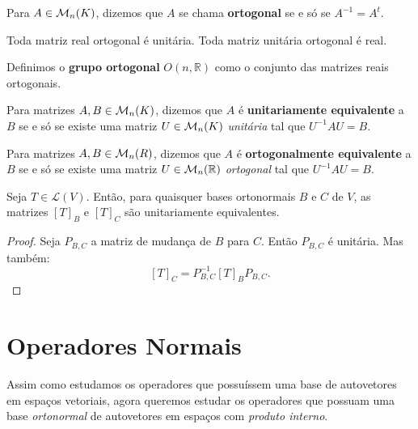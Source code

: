 \documentclass[11pt,twoside,a4paper]{book}
\begin{document}
\begin{definicao}
Para $A\in\mathcal{M}_{n}(K)$, dizemos que $A$ se chama \textbf{ortogonal} se e só se $A^{-1}=A^t$.
\end{definicao}

\begin{observacao}
Toda matriz real ortogonal é unitária. Toda matriz unitária ortogonal é real.
\end{observacao}

\begin{definicao}
Definimos o \textbf{grupo ortogonal} $O(n,\mathbb{R})$ como o conjunto das matrizes reais ortogonais.
\end{definicao}

\begin{definicao}
Para matrizes $A,B\in\mathcal{M}_{n}(K)$, dizemos que $A$ é \textbf{unitariamente equivalente} a $B$ se e só se existe uma matriz $U\in\mathcal{M}_{n}(K)$ \emph{unitária} tal que $U^{-1}AU=B$.
\end{definicao}

\begin{definicao}
Para matrizes $A,B\in\mathcal{M}_{n}(R)$, dizemos que $A$ é \textbf{ortogonalmente equivalente} a $B$ se e só se existe uma matriz $U\in\mathcal{M}_{n}(\mathbb{R})$ \emph{ortogonal} tal que $U^{-1}AU=B$.
\end{definicao}

\begin{proposicao}
Seja $T\in\mathcal{L}(V)$. Então, para quaisquer bases ortonormais $B$ e $C$ de $V$, as matrizes $[T]_B$ e $[T]_C$ são unitariamente equivalentes.
\end{proposicao}
\begin{proof}
Seja $P_{B,C}$ a matriz de mudança de $B$ para $C$. Então $P_{B,C}$ é unitária. Mas também:
\[
[T]_C=P^{-1}_{B,C}[T]_BP_{B,C}.
\]
\end{proof}

\section{Operadores Normais}

Assim como estudamos os operadores que possuíssem uma base de autovetores em espaços vetoriais, agora queremos estudar os operadores que possuam uma base \emph{ortonormal} de autovetores em espaços com \emph{produto interno}.
\end{document}

